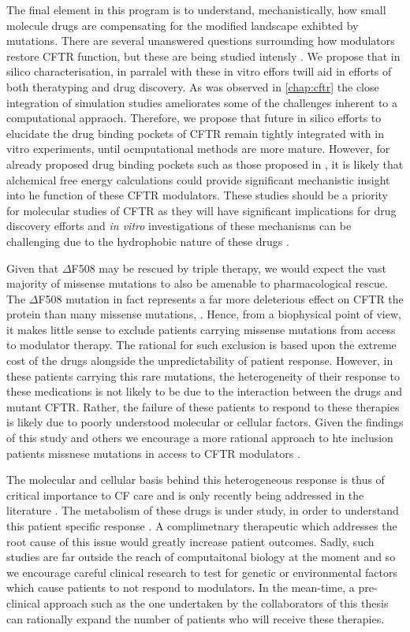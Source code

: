 The final element in this program is to understand, mechanistically, how small molecule drugs are compensating for the modified landscape exhibted by mutations. There are several unanswered questions surrounding how modulators restore CFTR function, but these are being studied intensly \cite{}. We propose that in silico characterisation, in parralel with these in vitro effors twill aid in efforts of both theratyping and drug discovery. As was observed in \ref{chap:cftr} the close integration of simulation studies ameliorates some of the challenges inherent to a computational appraoch. Therefore, we propose that future in silico efforts to elucidate the drug binding pockets of CFTR remain tightly integrated with in vitro experiments, until ocmputational methods are more mature. However, for already proposed drug binding pockets such as those proposed in \cite{}, it is likely that alchemical free energy calculations could provide significant mechanistic insight into he function of these CFTR modulators. These studies should be a priority for molecular studies of CFTR as they will have significant implications for drug discovery efforts and \textit{in vitro} investigations of these mechanisms can be challenging due to the hydrophobic nature of these drugs \cite{csanady2019}. 


Given that $\Delta$F508 may be rescued by triple therapy, we would expect the vast majority of missense mutations to also be amenable to pharmacological rescue. The $\Delta$F508 mutation in fact represents a far more deleterious effect on CFTR the protein than many missense mutations, \cite{bahia2021}. Hence, from a biophysical point of view, it makes little sense to exclude patients carrying missense mutations from access to modulator therapy. The rational for such exclusion is based upon the extreme cost of the drugs alongside the unpredictability of patient response. However, in these patients carrying this rare mutations, the heterogeneity of their response to these medications is not likely to be due to the interaction between the drugs and mutant CFTR. Rather, the failure of these patients to respond to these therapies is likely due to poorly understood molecular or cellular factors. Given the findings of this study and others we encourage a more rational approach to hte inclusion patients missnese mutations in access to CFTR modulators \cite{}. 

The molecular and cellular basis behind this heterogeneous response is thus of critical importance to CF care and is only recently being addressed in the literature \cite{}. The metabolism of these drugs is under study, in order to understand this patient specific response \cite{hanafin2021}. A complimetnary therapeutic which addresses the root cause of this issue would greatly increase patient outcomes. Sadly, such studies are far outside the reach of computaitonal biology at the moment and so we encourage careful clinical research to test for genetic or environmental factors which cause patients to not respond to modulators. In the mean-time, a pre-clinical approach such as the one undertaken by the collaborators of this thesis can rationally expand the number of patients who will receive these therapies.


